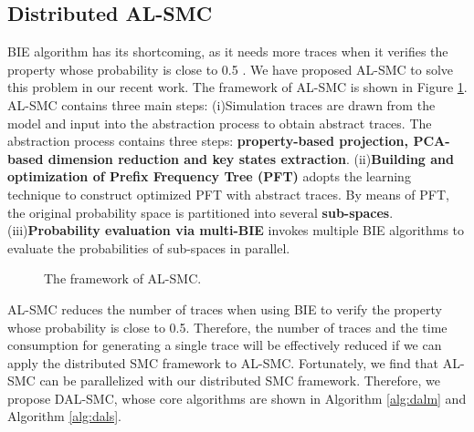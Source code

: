 \subsection{Distributed AL-SMC}
BIE algorithm has its shortcoming, as it needs more traces when it verifies the property whose probability is close to 0.5 \cite{zuliani2013bayesian}. We have proposed AL-SMC to solve this problem in our recent work. The framework of AL-SMC is shown in Figure \ref{al-smc}. AL-SMC contains three main steps: (i)Simulation traces are drawn from the model and input into the abstraction process to obtain abstract traces. The abstraction process contains three steps: \textbf{property-based projection, PCA-based dimension reduction \cite{dunteman1989principal} and key states extraction}. (ii)\textbf{Building and optimization of Prefix Frequency Tree (PFT)} adopts the learning technique \cite{carrasco1994learning} to construct optimized PFT with abstract traces. By means of PFT, the original probability space is partitioned into several \textbf{sub-spaces}. (iii)\textbf{Probability evaluation via multi-BIE} invokes multiple BIE algorithms to evaluate the probabilities of sub-spaces in parallel.  

\begin{figure}[htbp]
	\caption{The framework of AL-SMC.}\label{al-smc}
\end{figure}

AL-SMC reduces the number of traces when using BIE to verify the property whose probability is close to 0.5. Therefore, the number of traces and the time consumption for generating a single trace will be effectively reduced if we can apply the distributed SMC framework to AL-SMC. Fortunately, we find that AL-SMC can be  parallelized with our distributed SMC framework. Therefore, we propose DAL-SMC, whose core algorithms are shown in Algorithm \ref{alg:dalm} and Algorithm \ref{alg:dals}.

